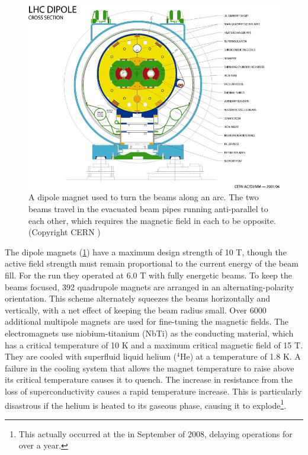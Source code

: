 \begin{figure}[t]
\includegraphics{LHC-PHO-2001-187.jpg}
\caption{A dipole magnet used to turn the beams along an arc. The two beams travel in the evacuated beam pipes running anti-parallel to each other, which requires the magnetic field in each to be opposite. (Copyright CERN \cite{Valeriane:843195})}
\label{fig:dipole_cross_section}
\end{figure}

The dipole magnets (\cref{fig:dipole_cross_section}) have a maximum design strength of 10 T, though the active field strength must remain proportional to the current energy of the beam fill.
For the \pPbenergy \pPb run they operated at 6.0 T with fully energetic beams.
To keep the beams focused, 392 quadrupole magnets are arranged in an alternating-polarity orientation.
This scheme alternately squeezes the beams horizontally and vertically, with a net effect of keeping the beam radius small.
Over 6000 additional multipole magnets are used for fine-tuning the magnetic fields.
The electromagnets use niobium-titanium (NbTi) as the conducting material, which has a critical temperature of 10 K and a maximum critical magnetic field of 15 T.
They are cooled with superfluid liquid helium (${}^{4}\textrm{He}$) at a temperature of 1.8 K.
A failure in the cooling system that allows the magnet temperature to raise above its critical temperature causes it to quench.
The increase in resistance from the loss of superconductivity causes a rapid temperature increase.
This is particularly disastrous if the helium is heated to its gaseous phase, causing it to explode\footnote{This actually occurred at the \lhc in September of 2008, delaying operations for over a year.}.


